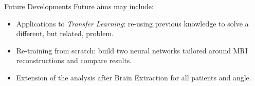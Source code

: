 \documentclass[10pt, unicode]{beamer}
\begin{document}
\begin{frame}{Future Developments}
\large
  Future aims may include:
  \begin{itemize}
   \item Applications to {\it Transfer Learning}: re-using previous knowledge to solve a different, but related, problem.
   \item Re-training from scratch: build two neural networks tailored around MRI reconstructions and compare results.
   \item Extension of the analysis after Brain Extraction for all patients and angle.
  \end{itemize}

  
\end{frame}


 
\end{document}
